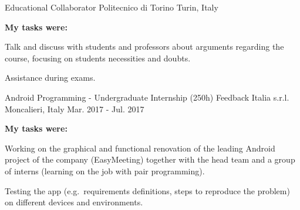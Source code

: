 {\begin{cventries}
  \cventry
    {Educational Collaborator} %
    {Politecnico di Torino} %
    {Turin, Italy} %
    {} %
    {
      \begin{cvsubentries}
      \end{cvsubentries}
      \begin{cvparagraph}
        \vspace{-3mm}
        {\textbf{My tasks were:}}
      \end{cvparagraph}
      \begin{cvitems} %
        \item {Talk and discuss with students and professors about arguments regarding the course, focusing on students necessities and doubts.}
        \item {Assistance during exams.}
      \end{cvitems}
    }

  \cventry
    {Android Programming - Undergraduate Internship (250h)} %
    {Feedback Italia s.r.l.} %
    {Moncalieri, Italy} %
    {Mar. 2017 - Jul. 2017} %
    {
      \begin{cvparagraph}
        {\textbf{My tasks were:}}
      \end{cvparagraph}
      \begin{cvitems} %
        \item {Working on the graphical and functional renovation of the leading Android project of the company (EasyMeeting) together with the head team and a group of interns (learning on the job with pair programming).}
        \item {Testing the app (e.g.\ requirements definitions, steps to reproduce the problem) on different devices and environments.}
      \end{cvitems}
    }


\end{cventries}}
